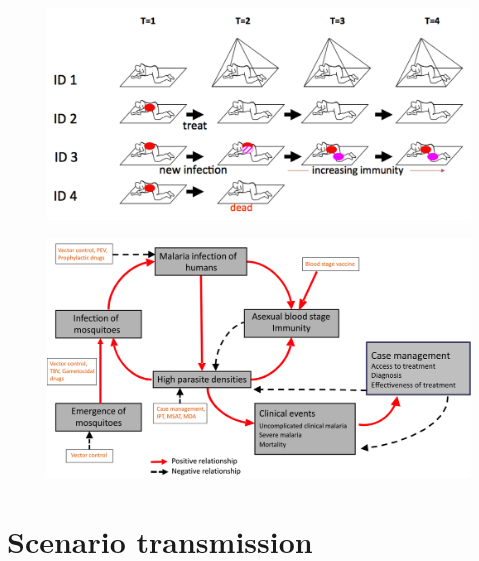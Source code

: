 \documentclass[]{scrartcl}
\begin{document}
\begin{itemize}
\begin{figure}
\includegraphics[width=\textwidth]{images/malariatreatment.png}
\end{figure}

\begin{figure}
\includegraphics[width=\textwidth]{images/accesstotreatment.png}
\end{figure}
\section{Scenario transmission}



\end{itemize}
\end{document}
